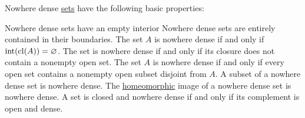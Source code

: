 \begin{proposition}\label{thm:nowhere_dense_properties}
  Nowhere dense \hyperref[def:topologically_dense_set/nowhere_dense]{sets} have the following basic properties:
  \begin{propenum}
     Nowhere dense sets have an empty interior
     Nowhere dense sets are entirely contained in their boundaries.
     The set \( A \) is nowhere dense if and only if \( \operatorname{int}(\operatorname{cl}(A)) = \varnothing \).
     The set is nowhere dense if and only if its closure does not contain a nonempty open set.
    \cite[proposition 1.3.5]{Engelking1989} The set \( A \) is nowhere dense if and only if every open set contains a nonempty open subset disjoint from \( A \).
     A subset of a nowhere dense set is nowhere dense.
     The \hyperref[def:homeomorphism]{homeomorphic} image of a nowhere dense set is nowhere dense.
     A set is closed and nowhere dense if and only if its complement is open and dense.
  \end{propenum}
\end{proposition}
